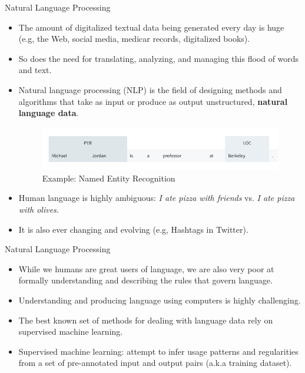 \documentclass[handout]{beamer}
\begin{document}
\begin{frame}{Natural Language Processing}
\begin{scriptsize}
\begin{itemize}

\item The amount of digitalized textual data being generated every day is huge (e.g, the Web, social media, medicar records, digitalized books).

\item So does the need for translating, analyzing, and managing this flood of words and text.

\item Natural language processing (NLP) is the field of designing methods and algorithms that take as input or produce as output unstructured, \textbf{natural language data}. 

     \begin{figure}[h]
        	\includegraphics[scale = 0.4]{pics/NER.png}
        	\caption{Example: Named Entity Recognition}
        \end{figure}

\item Human language is highly ambiguous: \emph{I ate pizza with friends} vs. \emph{I ate pizza with olives}.

\item It is also ever changing and evolving (e.g, Hashtags in Twitter). 

\end{itemize}
\end{scriptsize}
\end{frame}

\begin{frame}{Natural Language Processing}
\begin{scriptsize}
\begin{itemize}

\item While we humans are great users of language, we are also very poor at formally understanding and describing the rules that govern  language.

\item  Understanding and producing language using computers is highly challenging.
\item The best known set of methods for dealing with language data rely on supervised machine learning.
\item Supervised machine learning: attempt to infer usage patterns and regularities from a set of pre-annotated input and output pairs (a.k.a training dataset).

\end{itemize}
\end{scriptsize}
\end{frame}
\end{document}
